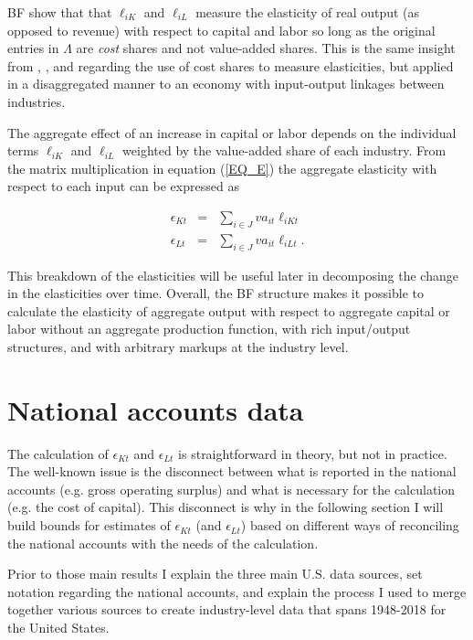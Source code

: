 \documentclass[11pt]{article}
\begin{document}
BF show that that $\ell_{iK}$ and $\ell_{iL}$ measure the elasticity of real output (as opposed to revenue) with respect to capital and labor so long as the original entries in $\Lambda$ are \textit{cost} shares and not value-added shares. This is the same insight from \cite{hall1988,hall1990}, \cite{basufernald}, and \cite{fernaldneiman2011} regarding the use of cost shares to measure elasticities, but applied in a disaggregated manner to an economy with input-output linkages between industries.

The aggregate effect of an increase in capital or labor depends on the individual terms $\ell_{iK}$ and $\ell_{iL}$ weighted by the value-added share of each industry. From the matrix multiplication in equation (\ref{EQ_E}) the aggregate elasticity with respect to each input can be expressed as

\begin{eqnarray}
	\epsilon_{Kt} &=& \sum_{i \in J} va_{it} \ell_{iKt} \\ \nonumber
	\epsilon_{Lt} &=& \sum_{i \in J} va_{it} \ell_{iLt}. \label{EQ_epsilonK}
\end{eqnarray}

This breakdown of the elasticities will be useful later in decomposing the change in the elasticities over time. Overall, the BF structure makes it possible to calculate the elasticity of aggregate output with respect to aggregate capital or labor without an  aggregate production function, with rich input/output structures, and with arbitrary markups at the industry level.

\section{National accounts data}
The calculation of $\epsilon_{Kt}$ and $\epsilon_{Lt}$ is straightforward in theory, but not in practice. The well-known issue is the disconnect between what is reported in the national accounts (e.g. gross operating surplus) and what is necessary for the calculation (e.g. the cost of capital). This disconnect is why in the following section I will build bounds for estimates of $\epsilon_{Kt}$ (and $\epsilon_{Lt}$) based on different ways of reconciling the national accounts with the needs of the calculation. 

Prior to those main results I explain the three main U.S. data sources, set notation regarding the national accounts, and explain the process I used to merge together various sources to create industry-level data that spans 1948-2018 for the United States.
\end{document}
